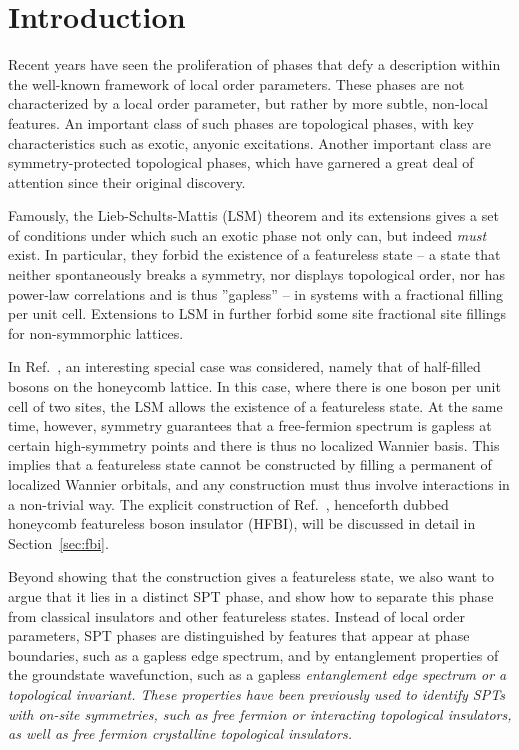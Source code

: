 
\section{Introduction}


Recent years have seen the proliferation of phases that defy a description
within the well-known framework of local order parameters. These phases are
not characterized by a local order parameter, but rather by more subtle,
non-local features. An important class of such phases are topological phases,
with key characteristics such as exotic, anyonic excitations. Another
important class are symmetry-protected topological phases, which have
garnered a great deal of attention since their original discovery.

Famously, the Lieb-Schults-Mattis (LSM) theorem and its extensions gives a set of
conditions under which such an exotic phase not only can, but indeed \emph{must}
exist. In particular, they forbid the existence of a featureless state
-- a state that neither spontaneously breaks a symmetry, nor displays topological
order, nor has power-law correlations and is thus ''gapless'' -- in systems
with a fractional filling per unit cell. Extensions to LSM in  further
forbid some site fractional site fillings for non-symmorphic lattices.

In Ref.~, an interesting special case was considered,
namely that of half-filled bosons on the honeycomb lattice. In this case, where
there is one boson per unit cell of two sites, the LSM allows the existence
of a featureless state. At the same time, however, symmetry guarantees that
a free-fermion spectrum is gapless at certain high-symmetry points and there is
thus no localized Wannier basis. This implies that
a featureless state cannot be constructed by filling a permanent
of localized Wannier orbitals, and any construction must thus involve interactions
in a non-trivial way. The explicit construction of Ref.~,
henceforth dubbed honeycomb featureless boson insulator (HFBI),
will be discussed in detail in Section~\ref{sec:fbi}.

Beyond showing that the construction gives a featureless state, we also want 
to argue that it lies in a distinct SPT phase, and show how to separate this 
phase from classical insulators and other featureless states. Instead of local 
order parameters, SPT phases are distinguished by features that appear at 
phase boundaries, such as a gapless edge spectrum, and by entanglement 
properties of the groundstate wavefunction, such as a gapless \em{entanglement 
edge spectrum} or a topological invariant. These properties have been previously used to identify SPTs with on-site symmetries, such as free fermion or interacting topological insulators, as well as free fermion crystalline topological insulators. 

